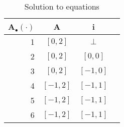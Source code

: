 \begin{table}
\begin{tabular}{| r | c | c | c |}
\hline
A$_\bullet (\cdot) $ & A   & i \\
\hline
1         & $[0,2]$    & $\bot$ \\
2         & $[0,2]$ & $[0,0]$ \\
3         & $[0,2]$ & $[-1,0]$ \\
4         & $[-1,2]$ & $[-1,1]$ \\
5         & $[-1,2]$ & $[-1,1]$ \\
6         & $[-1,2]$ & $[-1,1]$ \\
\hline
\end{tabular}
\centering
\caption{Solution to equations}
\label{tabel:interval_example_equations_solution}
\end{table}
